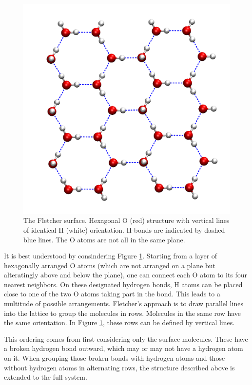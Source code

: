 \documentclass[8.5pt,twoside,twocolumn]{article}
\theoremstyle{standard}
\begin{document}
\begin{figure}[ht]
\includegraphics[width=.48\textwidth]{./img/FletcherAboveGlossyNoCueing.png}
\caption{The Fletcher surface. Hexagonal O (red) structure with vertical lines 
of identical H (white) orientation. H-bonds are indicated by dashed blue lines.
The O atoms are not all in the same plane.}
\label{Fig:Ads:Fletcher}
\end{figure}

It is best understood by consindering Figure \ref{Fig:Ads:Fletcher}. Starting
from a layer of hexagonally arranged O atoms (which are not arranged on a plane but 
alteratingly above and below the plane), one can connect each O atom to its
four nearest neighbors. On these designated hydrogen bonds, H atoms can be placed close
to one of the two O atoms taking part in the bond. This leads to a multitude
of possible arrangements. Fletcher's approach is to draw parallel
lines into the lattice to group the molecules in rows. Molecules in the
same row have the same orientation. In Figure \ref{Fig:Ads:Fletcher}, these
rows can be defined by vertical lines.

This ordering comes from first considering only the surface molecules. These
have a broken hydrogen bond outward, which may or may not have a hydrogen
atom on it. When grouping those broken bonds with hydrogen atoms and those
without hydrogen atoms in alternating rows, the structure described above is
extended to the full system.
\end{document}
